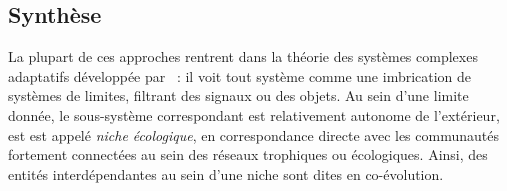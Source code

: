 \documentclass[11pt]{article}
\begin{document}

\subsection{Synthèse}

La plupart de ces approches rentrent dans la théorie des systèmes complexes adaptatifs développée par~\cite{holland2012signals} : il voit tout système comme une imbrication de systèmes de limites, filtrant des signaux ou des objets. Au sein d'une limite donnée, le sous-système correspondant est relativement autonome de l'extérieur, est est appelé \emph{niche écologique}, en correspondance directe avec les communautés fortement connectées au sein des réseaux trophiques ou écologiques. Ainsi, des entités interdépendantes au sein d'une niche sont dites en co-évolution. 
\end{document}
